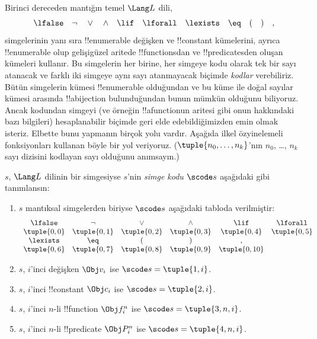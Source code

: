 \documentclass[../../../include/open-logic-section]{subfiles}
\begin{document}

Birinci dereceden mantığın temel $\Lang L$ dili,
\[
\lfalse \quad \lnot \quad \lor \quad \land \quad \lif \quad \lforall
\quad \lexists \quad \eq \quad ( \quad ) \quad ,
\]
simgelerinin yanı sıra !!{enumerable} değişken ve !!{constant} kümelerini,
ayrıca !!{enumerable} olup gelişigüzel aritede !!{function}s{}dan ve
!!{predicate}s{}den oluşan kümeleri kullanır. Bu simgelerin her birine, her simgeye kodu
olarak tek bir sayı atanacak ve farklı iki simgeye aynı sayı atanmayacak
biçimde \emph{kodlar} verebiliriz. Bütün simgelerin kümesi !!{enumerable}
olduğundan ve bu küme ile doğal sayılar kümesi arasında !!a{bijection}
bulunduğundan bunun mümkün olduğunu biliyoruz. Ancak kodundan simgeyi (ve
örneğin !!a{function}{}un aritesi gibi onun hakkındaki bazı bilgileri)
hesaplanabilir biçimde geri elde edebildiğimizden emin olmak isteriz. Elbette
bunu yapmanın birçok yolu vardır. Aşağıda ilkel özyinelemeli fonksiyonları
kullanan böyle bir yol veriyoruz. ($\tuple{n_0, \dots, n_k}$'nın
$n_0$, \dots, $n_k$ sayı dizisini kodlayan sayı olduğunu anımsayın.)

\begin{defn}
$s$, $\Lang L$ dilinin bir simgesiyse $s$'nin \emph{simge kodu}
$\scode s$ aşağıdaki gibi tanımlansın:
\begin{enumerate}
\item $s$ mantıksal simgelerden biriyse $\scode s$ aşağıdaki tabloda
  verilmiştir:
\[
\begin{array}{cccccccccc}
  \lfalse & \lnot & \lor & \land & \lif & \lforall \\
\tuple{0, 0} & \tuple{0, 1} & \tuple{0, 2} & \tuple{0, 3} &
\tuple{0, 4} & \tuple{0, 5} \\
\lexists & \eq & ( & ) & ,\\
\tuple{0, 6} & \tuple{0, 7} &
\tuple{0, 8} & \tuple{0, 9} & \tuple{0, 10}
\end{array}
\]
\item $s$, $i$'inci değişken $\Obj v_i$ ise $\scode s = \tuple{1, i}$.
\item $s$, $i$'inci !!{constant} $\Obj c_i$ ise
  $\scode s = \tuple{2, i}$.
\item $s$, $i$'inci $n$-li !!{function} $\Obj f_i^n$ ise
  $\scode s = \tuple{3, n, i}$.
\item $s$, $i$'inci $n$-li !!{predicate} $\Obj P_i^n$ ise
  $\scode s = \tuple{4, n, i}$.
\end{enumerate}
\end{defn}
\end{document}
